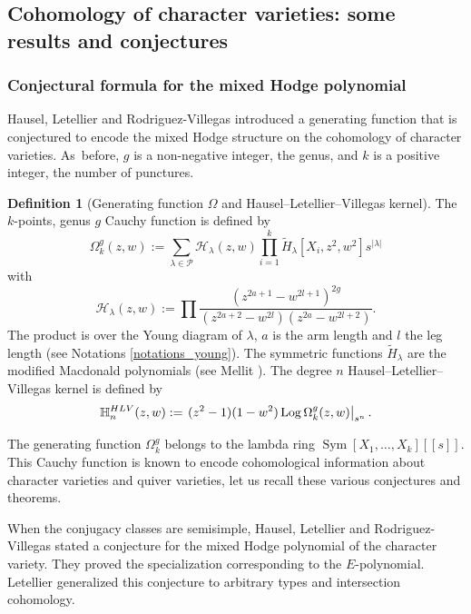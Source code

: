 \documentclass[11pt]{article}
\newcommand{\HLV}{\textup{HLV}}
\theoremstyle{definition}
\newtheorem{definition}{Definition}[section]
\theoremstyle{plain}
\DeclareMathOperator{\SymF}{Sym}
\DeclareMathOperator{\Log}{Log}
\newcommand{\Part}{\mathcal{P}}
\newcommand{\Ht}{\tilde{H}}
\begin{document}
\subsection{Cohomology of character varieties: some results and conjectures}\label{sect_cohomology_char}
\subsubsection{Conjectural formula for the mixed Hodge polynomial}
Hausel, Letellier and Rodriguez-Villegas \cite{Hausel_Letellier_Villegas} introduced a generating function that is conjectured to encode the mixed Hodge structure on the cohomology of character varieties. As~before, $g$ is a non-negative integer, the genus, and $k$ is a positive integer, the number of punctures.
\begin{definition}[Generating function $\Omega$ and Hausel--Letellier--Villegas kernel]\label{def_omega_hlv}
The $k$-points, genus $g$ Cauchy function is defined by
\begin{equation}
\Omega^g_k(z,w):=\sum_{\lambda\in\Part}\mathcal{H}_\lambda(z,w)\prod_{i=1}^k\Ht_\lambda\left[X_i,z^2,w^2\right]s^{|\lambda|}
\end{equation}
with
\begin{equation}
\mathcal{H}_\lambda(z,w):=\prod\frac{\left(z^{2a+1}-w^{2l+1}\right)^{2g}}{\left(z^{2a+2}-w^{2l}\right)\left(z^{2a}-w^{2l+2}\right)}.
\end{equation}
The product is over the Young diagram of $\lambda$, $a$ is the arm length and $l$ the leg length (see Notations \ref{notations_young}). The symmetric functions
$\widetilde{H}_{\lambda}$ are the modified Macdonald polynomials (see Mellit \cite[Def.\,2.5]{Mellit2020}).
The degree $n$ Hausel--Letellier--Villegas kernel is defined by
\[
\mathbb{H}^{\HLV}_n(z,w):=\left.(z^2-1)(1-w^2) \Log \Omega_k^g(z,w)\right|_{s^n}.
\]
\end{definition}
The generating function $\Omega_k^g$ belongs to the lambda ring $\SymF[X_1,\dots,X_k][\![s]\!]$. This Cauchy function is known to encode cohomological information about character varie\-ties and quiver varieties, let us recall these various conjectures and theorems.

\begin{sloppypar}
When the conjugacy classes are semisimple, Hausel, Letellier and Rodriguez-Villegas \cite{Hausel_Letellier_Villegas} stated a conjecture for the mixed Hodge polynomial of the character variety. They proved the specialization corresponding to the $E$-polynomial. Letellier generalized this conjecture to arbitrary types and intersection cohomology.
\end{sloppypar}
\end{document}
